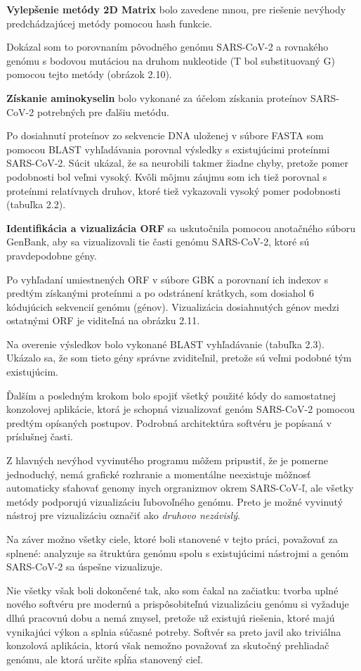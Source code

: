 \textbf{Vylepšenie metódy 2D Matrix } bolo zavedene mnou, pre riešenie nevýhody predchádzajúcej metódy pomocou hash funkcie.

Dokázal som to porovnaním pôvodného genómu SARS-CoV-2 a rovnakého genómu s bodovou mutáciou na druhom nukleotide (T bol substituovaný G) pomocou tejto metódy (obrázok 2.10).

\textbf{Získanie aminokyselin} bolo vykonané za účelom získania proteínov SARS-CoV-2 potrebných pre ďalšiu metódu.

Po dosiahnutí proteínov zo sekvencie DNA uloženej v súbore FASTA som pomocou BLAST vyhľadávania porovnal výsledky s existujúcimi proteínmi SARS-CoV-2.
Súcit ukázal, že sa neurobili takmer žiadne chyby, pretože pomer podobnosti bol veľmi vysoký.
Kvôli môjmu záujmu som ich tiež porovnal s proteínmi relatívnych druhov, ktoré tiež vykazovali vysoký pomer podobnosti (tabuľka 2.2).

\textbf{Identifikácia a vizualizácia ORF} sa uskutočnila pomocou anotačného súboru GenBank, aby sa vizualizovali tie časti genómu SARS-CoV-2, ktoré sú pravdepodobne gény.

Po vyhľadaní umiestnených ORF v súbore GBK a porovnaní ich indexov s predtým získanými proteínmi a po odstránení krátkych, som dosiahol 6 kódujúcich sekvencií genómu (génov).
Vizualizácia dosiahnutých génov medzi ostatnými ORF je viditeľná na obrázku 2.11.

Na overenie výsledkov bolo vykonané BLAST vyhľadávanie (tabuľka 2.3).
Ukázalo sa, že som tieto gény správne zviditeľnil, pretože sú veľmi podobné tým existujúcim.

\smallskip

Ďalším a posledným krokom bolo spojiť všetký použité kódy do samostatnej konzolovej aplikácie, ktorá je schopná vizualizovať genóm SARS-CoV-2 pomocou predtým opísaných postupov.
Podrobná architektúra softvéru je popísaná v príslušnej časti.

Z hlavných nevýhod vyvinutého programu môžem pripustiť, že je pomerne jednoduchý, nemá grafické rozhranie a momentálne neexistuje môžnosť automaticky sťahovať genomy inych orgranizmov okrem SARS-CoV-ľ, ale všetky metódy podporujú vizualizáciu ľubovoľného genómu.
Preto je možné vyvinutý nástroj pre vizualizáciu označiť ako \textit{druhovo nezávislý}.

\smallskip
Na záver možno všetky ciele, ktoré boli stanovené v tejto práci, považovať za splnené: analyzuje sa štruktúra genómu spolu s existujúcimi nástrojmi a genóm SARS-CoV-2 sa úspešne vizualizuje.

Nie všetky však boli dokončené tak, ako som čakal na začiatku: tvorba uplné nového softvéru pre modernú a prispôsobiteľnú vizualizáciu genómu si vyžaduje dlhú pracovnú dobu a nemá zmysel, pretože už existujú riešenia, ktoré majú vynikajúci výkon a splnia súčasné potreby.
Softvér sa preto javil ako triviálna konzolová aplikácia, ktorú však nemožno považovať za skutočný prehliadač genómu, ale ktorá určite spĺňa stanovený cieľ.

\label{evaluation}